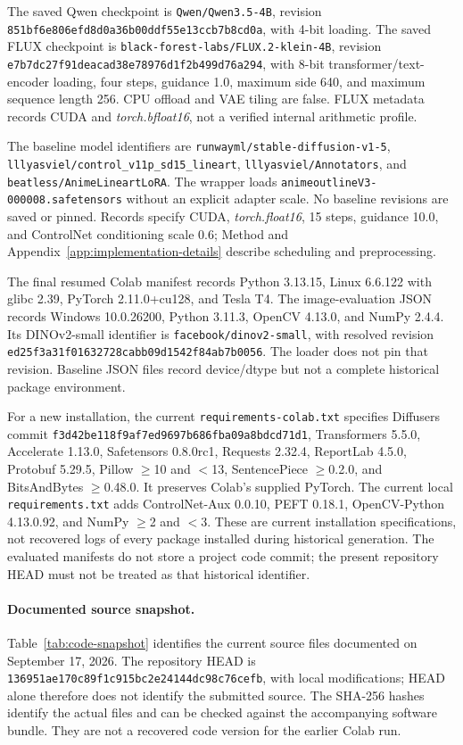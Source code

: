 The saved Qwen checkpoint is \nolinkurl{Qwen/Qwen3.5-4B}, revision \nolinkurl{851bf6e806efd8d0a36b00ddf55e13ccb7b8cd0a}, with 4-bit loading. The saved FLUX checkpoint is \nolinkurl{black-forest-labs/FLUX.2-klein-4B}, revision \nolinkurl{e7b7dc27f91deacad38e78976d1f2b499d76a294}, with 8-bit transformer/text-encoder loading, four steps, guidance 1.0, maximum side 640, and maximum sequence length 256. CPU offload and VAE tiling are false. FLUX metadata records CUDA and \emph{torch.bfloat16}, not a verified internal arithmetic profile.

The baseline model identifiers are \nolinkurl{runwayml/stable-diffusion-v1-5}, \nolinkurl{lllyasviel/control_v11p_sd15_lineart}, \nolinkurl{lllyasviel/Annotators}, and \nolinkurl{beatless/AnimeLineartLoRA}. The wrapper loads \nolinkurl{animeoutlineV3-000008.safetensors} without an explicit adapter scale. No baseline revisions are saved or pinned. Records specify CUDA, \emph{torch.float16}, 15 steps, guidance 10.0, and ControlNet conditioning scale 0.6; Method and Appendix~\ref{app:implementation-details} describe scheduling and preprocessing.

The final resumed Colab manifest records Python 3.13.15, Linux 6.6.122 with glibc 2.39, PyTorch 2.11.0+cu128, and Tesla T4. The image-evaluation JSON records Windows 10.0.26200, Python 3.11.3, OpenCV 4.13.0, and NumPy 2.4.4. Its DINOv2-small identifier is \nolinkurl{facebook/dinov2-small}, with resolved revision \nolinkurl{ed25f3a31f01632728cabb09d1542f84ab7b0056}. The loader does not pin that revision. Baseline JSON files record device/dtype but not a complete historical package environment.

For a new installation, the current \nolinkurl{requirements-colab.txt} specifies Diffusers commit \nolinkurl{f3d42be118f9af7ed9697b686fba09a8bdcd71d1}, Transformers 5.5.0, Accelerate 1.13.0, Safetensors 0.8.0rc1, Requests 2.32.4, ReportLab 4.5.0, Protobuf 5.29.5, Pillow $\geq$10 and $<$13, SentencePiece $\geq$0.2.0, and BitsAndBytes $\geq$0.48.0. It preserves Colab's supplied PyTorch. The current local \nolinkurl{requirements.txt} adds ControlNet-Aux 0.0.10, PEFT 0.18.1, OpenCV-Python 4.13.0.92, and NumPy $\geq$2 and $<$3. These are current installation specifications, not recovered logs of every package installed during historical generation. The evaluated manifests do not store a project code commit; the present repository HEAD must not be treated as that historical identifier.

\paragraph{Documented source snapshot.}
Table~\ref{tab:code-snapshot} identifies the current source files documented on September 17, 2026. The repository HEAD is \nolinkurl{136951ae170c89f1c915bc2e24144dc98c76cefb}, with local modifications; HEAD alone therefore does not identify the submitted source. The SHA-256 hashes identify the actual files and can be checked against the accompanying software bundle. They are not a recovered code version for the earlier Colab run.

